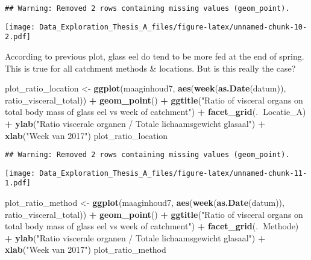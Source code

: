 \documentclass[]{article}
\newenvironment{Shaded}{\begin{snugshade}}{\end{snugshade}}
\newcommand{\KeywordTok}[1]{\textcolor[rgb]{0.13,0.29,0.53}{\textbf{#1}}}
\newcommand{\StringTok}[1]{\textcolor[rgb]{0.31,0.60,0.02}{#1}}
\newcommand{\OperatorTok}[1]{\textcolor[rgb]{0.81,0.36,0.00}{\textbf{#1}}}
\newcommand{\NormalTok}[1]{#1}
\begin{document}
\begin{verbatim}
## Warning: Removed 2 rows containing missing values (geom_point).
\end{verbatim}

\texttt{[image: Data\_Exploration\_Thesis\_A\_files/figure-latex/unnamed-chunk-10-2.pdf]}

According to previous plot, glass eel do tend to be more fed at the end
of spring. This is true for all catchment methods \& locations. But is
this really the case?

\begin{Shaded}
\begin{Highlighting}[]
\NormalTok{plot_ratio_location <-}\StringTok{ }\KeywordTok{ggplot}\NormalTok{(maaginhoud7, }\KeywordTok{aes}\NormalTok{(}\KeywordTok{week}\NormalTok{(}\KeywordTok{as.Date}\NormalTok{(datum)), ratio_visceral_total)) }\OperatorTok{+}
\StringTok{  }\KeywordTok{geom_point}\NormalTok{() }\OperatorTok{+}
\StringTok{  }\KeywordTok{ggtitle}\NormalTok{(}\StringTok{"Ratio of visceral organs on total body mass of glass eel vs week of catchment"}\NormalTok{) }\OperatorTok{+}
\StringTok{  }\KeywordTok{facet_grid}\NormalTok{(.}\OperatorTok{~}\NormalTok{Locatie_A) }\OperatorTok{+}
\StringTok{  }\KeywordTok{ylab}\NormalTok{(}\StringTok{"Ratio viscerale organen / Totale lichaamsgewicht glasaal"}\NormalTok{) }\OperatorTok{+}
\StringTok{  }\KeywordTok{xlab}\NormalTok{(}\StringTok{"Week van 2017"}\NormalTok{)}
\NormalTok{plot_ratio_location}
\end{Highlighting}
\end{Shaded}

\begin{verbatim}
## Warning: Removed 2 rows containing missing values (geom_point).
\end{verbatim}

\texttt{[image: Data\_Exploration\_Thesis\_A\_files/figure-latex/unnamed-chunk-11-1.pdf]}

\begin{Shaded}
\begin{Highlighting}[]
\NormalTok{plot_ratio_method <-}\StringTok{ }\KeywordTok{ggplot}\NormalTok{(maaginhoud7, }\KeywordTok{aes}\NormalTok{(}\KeywordTok{week}\NormalTok{(}\KeywordTok{as.Date}\NormalTok{(datum)), ratio_visceral_total)) }\OperatorTok{+}
\StringTok{  }\KeywordTok{geom_point}\NormalTok{() }\OperatorTok{+}
\StringTok{  }\KeywordTok{ggtitle}\NormalTok{(}\StringTok{"Ratio of visceral organs on total body mass of glass eel vs week of catchment"}\NormalTok{) }\OperatorTok{+}
\StringTok{  }\KeywordTok{facet_grid}\NormalTok{(.}\OperatorTok{~}\NormalTok{Methode) }\OperatorTok{+}
\StringTok{  }\KeywordTok{ylab}\NormalTok{(}\StringTok{"Ratio viscerale organen / Totale lichaamsgewicht glasaal"}\NormalTok{) }\OperatorTok{+}
\StringTok{  }\KeywordTok{xlab}\NormalTok{(}\StringTok{"Week van 2017"}\NormalTok{)}
\NormalTok{plot_ratio_method}
\end{Highlighting}
\end{Shaded}
\end{document}
